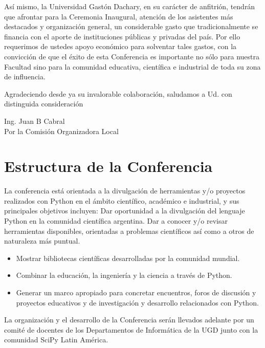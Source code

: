 \documentclass[11pt,a4paper]{report}
\begin{document}
        Así mismo, la Universidad Gastón Dachary,  en su carácter de
        anfitrión, tendrán que afrontar para la Ceremonia Inaugural, atención
        de los asistentes más destacados y organización general, un
        considerable gasto que tradicionalmente se financia con el aporte de
        instituciones públicas y privadas del país. Por ello requerimos de
        ustedes apoyo económico para solventar tales gastos, con la convicción
        de que el éxito de esta Conferencia es importante no sólo para nuestra
        Facultad sino para la comunidad educativa, científica e industrial de
        toda su zona de influencia.

        Agradeciendo desde ya su invalorable colaboración, saludamos a Ud.
        con distinguida consideración\\[0.5cm]



\begin{flushright}
Ing. Juan B Cabral\\
Por la Comisión Organizadora Local \\

\end{flushright}
\newpage
\section*{Estructura de la Conferencia}

    La conferencia está orientada a la divulgación de herramientas y/o
    proyectos realizados con Python en el ámbito científico, académico e
    industrial, y sus principales objetivos incluyen: Dar oportunidad a la
    divulgación del lenguaje Python en la comunidad científica argentina.
    Dar a conocer y/o revisar herramientas disponibles, orientadas a problemas
    científicos así como a otros de naturaleza más puntual.
  \begin{itemize}
    \item Mostrar bibliotecas científicas desarrolladas por la comunidad mundial.
    \item Combinar la educación, la ingeniería y la ciencia a través de Python.
    \item Generar un marco apropiado para concretar encuentros, foros de discusión y proyectos educativos y de investigación y desarrollo relacionados con Python.
  \end{itemize}
La organización y el desarrollo de la Conferencia serán llevados adelante
por un comité de docentes de los Departamentos de Informática de la UGD junto
con la comunidad SciPy Latin América.
\end{document}
